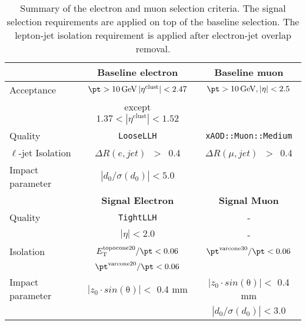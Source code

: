 	
\begin{table}[htb!] 
	\begin{center}
	    \begin{tabular}{|l|c|c|}
	     \hline
	     \hline
	       & \textbf{Baseline electron} & \textbf{Baseline muon} \\
	     \hline
	     \hline
	     Acceptance     & $\pt > 10\,\mathrm{GeV}\, |\eta^\mathrm{clust}| < 2.47$  & $\pt > 10\,\mathrm{GeV}, |\eta| < 2.5$ \\
	                     &  except $1.37<|\eta^\mathrm{clust}|<1.52$       & \\
	     \hline
	     Quality & {\tt LooseLLH} & {\tt{xAOD::Muon::Medium}} \\
         \hline
         $\ell$-jet Isolation      & $\Delta{}R(e,jet)$~$>$~0.4 & $\Delta{}R(\mu,jet)$~$>$~0.4 \\
         \hline
         Impact parameter & $|d_0/\sigma(d_0)|<5.0$  & \\
         \hline\hline
         & \textbf{Signal Electron} & \textbf{Signal Muon} \\
         \hline
         \hline
         Quality & {\tt TightLLH} & -\\
         & $|\eta|<2.0$  & -\\
         \hline
         Isolation                & $E_{\mathrm{T}}^{\mathrm{topocone20}} / \pt < 0.06$ & $\pt^{\mathrm{varcone30}} / \pt < 0.06$ \\
                                  & $\pt^{\mathrm{varcone20}} / \pt < 0.06$  & \\
         \hline
         Impact parameter & $|z_0 \cdot sin(\mathrm{\theta})|<$ 0.4 mm   & $|z_0 \cdot sin(\mathrm{\theta})|<$ 0.4 mm \\ 
                       &                                     & $|d_0/\sigma(d_0)| < 3.0$\\
         \hline
		\end{tabular}
	\end{center}
\caption{Summary of the electron and muon selection criteria. The signal
  selection requirements are applied on top of the baseline selection. The
  lepton-jet isolation requirement is applied after electron-jet overlap
  removal.}
\label{tab:lepton_def_appR}
\end{table}
	
